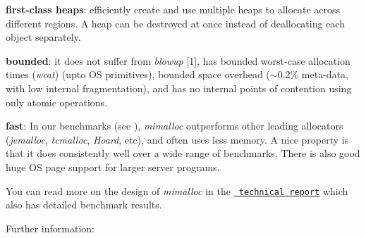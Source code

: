 \begin{DoxyItemize}
\item {\bfseries{first-\/class heaps}}\+: efficiently create and use multiple heaps to allocate across different regions. A heap can be destroyed at once instead of deallocating each object separately.
\item {\bfseries{bounded}}\+: it does not suffer from {\itshape blowup} \mbox{[}1\mbox{]}, has bounded worst-\/case allocation times ({\itshape wcat}) (upto OS primitives), bounded space overhead (\texorpdfstring{$\sim$}{\string~}0.2\% meta-\/data, with low internal fragmentation), and has no internal points of contention using only atomic operations.
\item {\bfseries{fast}}\+: In our benchmarks (see ), {\itshape mimalloc} outperforms other leading allocators ({\itshape jemalloc}, {\itshape tcmalloc}, {\itshape Hoard}, etc), and often uses less memory. A nice property is that it does consistently well over a wide range of benchmarks. There is also good huge OS page support for larger server programs.
\end{DoxyItemize}

You can read more on the design of {\itshape mimalloc} in the \href{https://www.microsoft.com/en-us/research/publication/mimalloc-free-list-sharding-in-action}{\texttt{ technical report}} which also has detailed benchmark results.

Further information\+:


\begin{DoxyItemize}
\item {}
\item {}
\item {}
\item {}
\item {}
\item {}
\item {}
\item {}
\item {}
\item {}
\item {}
\item {}
\item {}
\item {} 
\end{DoxyItemize}